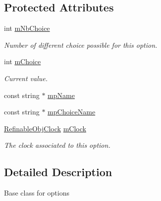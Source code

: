 \subsection*{Protected Attributes}
\begin{DoxyCompactItemize}
\item 
\mbox{\label{class_obj_cryst_1_1_ref_obj_opt_a54ae7b002c156671d5b2176a46cf95d5}} 
int \mbox{\hyperlink{class_obj_cryst_1_1_ref_obj_opt_a54ae7b002c156671d5b2176a46cf95d5}{m\+Nb\+Choice}}
\begin{DoxyCompactList}\small\item\em Number of different choice possible for this option. \end{DoxyCompactList}\item 
\mbox{\label{class_obj_cryst_1_1_ref_obj_opt_a34f40080b3adac88e5ab7e290dc951ae}} 
int \mbox{\hyperlink{class_obj_cryst_1_1_ref_obj_opt_a34f40080b3adac88e5ab7e290dc951ae}{m\+Choice}}
\begin{DoxyCompactList}\small\item\em Current value. \end{DoxyCompactList}\item 
const string $\ast$ \mbox{\hyperlink{class_obj_cryst_1_1_ref_obj_opt_a45eb6eed7f6578f438433acddb2f1eb2}{mp\+Name}}
\item 
const string $\ast$ \mbox{\hyperlink{class_obj_cryst_1_1_ref_obj_opt_abc47d0f345c4121b6492e754b30f4fef}{mp\+Choice\+Name}}
\item 
\mbox{\label{class_obj_cryst_1_1_ref_obj_opt_ace306a0100bbb1678c9b8683a009dc81}} 
\mbox{\hyperlink{class_obj_cryst_1_1_refinable_obj_clock}{Refinable\+Obj\+Clock}} \mbox{\hyperlink{class_obj_cryst_1_1_ref_obj_opt_ace306a0100bbb1678c9b8683a009dc81}{m\+Clock}}
\begin{DoxyCompactList}\small\item\em The clock associated to this option. \end{DoxyCompactList}\end{DoxyCompactItemize}


\subsection{Detailed Description}
Base class for options 

